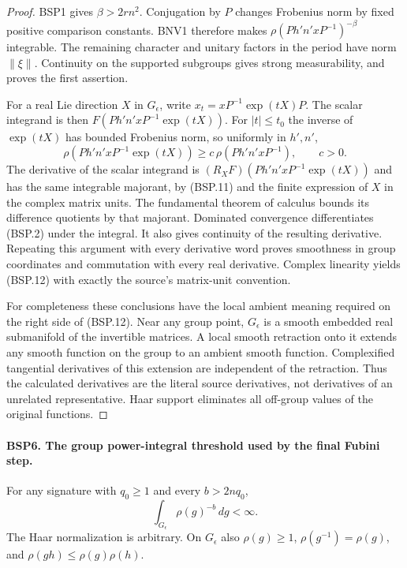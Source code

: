 \documentclass[11pt,a4paper]{article}
\numberwithin{equation}{section}
\theoremstyle{remark}\newtheorem{remark}[theorem]{Remark}
\begin{document}
\begin{proof}
BSP1 gives $\beta>2rn^2$.  Conjugation by $P$ changes Frobenius norm
by fixed positive comparison constants.  BNV1 therefore makes
$\rho(P h'n'xP^{-1})^{-\beta}$ integrable.  The remaining character
and unitary factors in the period have norm $\|\xi\|$.
Continuity on the supported subgroups gives strong measurability,
and proves the first assertion.

For a real Lie direction $X$ in $G_\epsilon$, write
$x_t=xP^{-1}\exp(tX)P$.  The scalar integrand is then
$F(P h'n'xP^{-1}\exp(tX))$.
For $|t|\le t_0$ the inverse of $\exp(tX)$ has bounded Frobenius norm,
so uniformly in $h',n'$,
\[
 \rho(P h'n'xP^{-1}\exp(tX))
       \ge c\,\rho(P h'n'xP^{-1}),\qquad c>0.
\]
The derivative of the scalar integrand is
$(R_XF)(P h'n'xP^{-1}\exp(tX))$ and has the same integrable majorant,
by (BSP.11) and the finite expression of $X$ in the complex matrix units.
The fundamental theorem of calculus bounds its difference quotients
by that majorant.  Dominated convergence differentiates (BSP.2) under
the integral.  It also gives continuity of the resulting derivative.
Repeating this argument with every derivative word proves smoothness
in group coordinates and commutation with every real derivative.
Complex linearity yields (BSP.12) with exactly the source's matrix-unit
convention.

For completeness these conclusions have the local ambient meaning
required on the right side of (BSP.12).  Near any group point,
$G_\epsilon$ is a smooth embedded real submanifold of the invertible
matrices.  A local smooth retraction onto it extends any smooth function
on the group to an ambient smooth function.  Complexified tangential
derivatives of this extension are independent of the retraction.
Thus the calculated derivatives are the literal source derivatives,
not derivatives of an unrelated representative.  Haar support
eliminates all off-group values of the original functions.
\end{proof}

\paragraph{BSP6. The group power-integral threshold used by the final Fubini step.}
\label{claim:BSP6}
For any signature with $q_0\ge1$ and every $b>2nq_0$,
\[
             \int_{G_\epsilon}\rho(g)^{-b}\,dg<\infty.
 \tag{BSP.13}
\]
The Haar normalization is arbitrary.  On $G_\epsilon$ also
$\rho(g)\ge1$, $\rho(g^{-1})=\rho(g)$, and
$\rho(gh)\le\rho(g)\rho(h)$.
\end{document}
